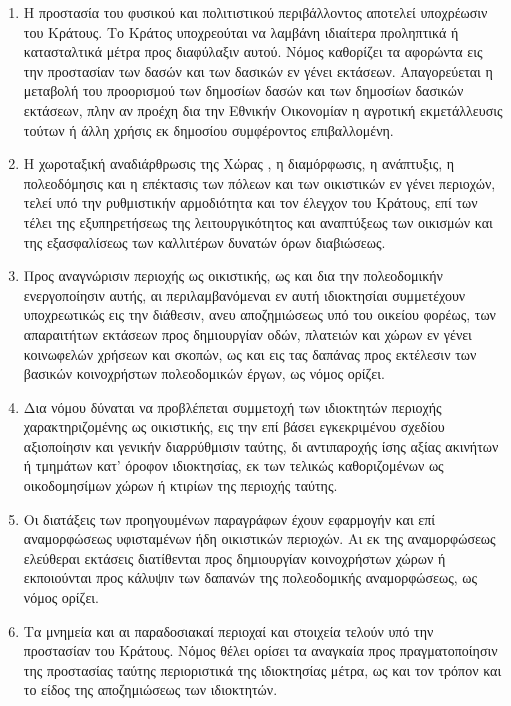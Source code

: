 \documentclass[twoside, a4paper, 10pt]{article}
\begin{document}
\begin{multicols}{2}
\begin{enumerate}
\begin{BigQuote}
\begin{enumerate}
  \item[1.] Η προστασία του φυσικού και πολιτιστικού περιβάλλοντος αποτελεί υποχρέωσιν του Κράτους. Το Κράτος  υποχρεούται να λαμβάνη ιδιαίτερα προληπτικά ή κατασταλτικά μέτρα προς διαφύλαξιν αυτού. Νόμος καθορίζει τα αφορώντα εις την προστασίαν των δασών και των δασικών εν γένει εκτάσεων. Απαγορεύεται  η μεταβολή του προορισμού των δημοσίων δασών και των δημοσίων δασικών εκτάσεων, πλην αν προέχη δια την Εθνικήν Οικονομίαν η αγροτική  εκμετάλλευσις τούτων ή άλλη χρήσις εκ δημοσίου συμφέροντος επιβαλλομένη.
  \item[2.] Η χωροταξική αναδιάρθρωσις της Χώρας , η διαμόρφωσις, η ανάπτυξις, η πολεοδόμησις και η επέκτασις των πόλεων και των οικιστικών εν γένει περιοχών, τελεί υπό την ρυθμιστικήν αρμοδιότητα και τον έλεγχον του Κράτους, επί των τέλει της εξυπηρετήσεως της  λειτουργικότητος και αναπτύξεως των οικισμών και της εξασφαλίσεως των καλλιτέρων δυνατών όρων διαβιώσεως.
  \item[3.] Προς αναγνώρισιν περιοχής ως οικιστικής, ως και δια την πολεοδομικήν ενεργοποίησιν αυτής, αι περιλαμβανόμεναι εν αυτή ιδιοκτησίαι συμμετέχουν υποχρεωτικώς εις την διάθεσιν, ανευ αποζημιώσεως υπό του οικείου φορέως, των απαραιτήτων εκτάσεων προς δημιουργίαν οδών, πλατειών και χώρων εν γένει κοινωφελών χρήσεων και σκοπών, ως και εις τας δαπάνας προς εκτέλεσιν των βασικών κοινοχρήστων πολεοδομικών έργων, ως νόμος ορίζει.
  \item[4.] Δια νόμου  δύναται να προβλέπεται συμμετοχή των ιδιοκτητών περιοχής χαρακτηριζομένης ως οικιστικής, εις την επί βάσει εγκεκριμένου σχεδίου αξιοποίησιν και γενικήν διαρρύθμισιν ταύτης, δι αντιπαροχής ίσης αξίας ακινήτων ή τμημάτων κατ' όροφον ιδιοκτησίας, εκ των τελικώς καθοριζομένων ως οικοδομησίμων χώρων ή κτιρίων της περιοχής ταύτης.
  \item[5.] Οι διατάξεις των προηγουμένων παραγράφων έχουν εφαρμογήν και επί αναμορφώσεως υφισταμένων ήδη οικιστικών περιοχών. Αι εκ της αναμορφώσεως ελεύθεραι εκτάσεις διατίθενται προς δημιουργίαν κοινοχρήστων χώρων ή εκποιούνται προς κάλυψιν των δαπανών της πολεοδομικής αναμορφώσεως, ως νόμος ορίζει.
  \item[6.] Τα μνημεία και αι παραδοσιακαί περιοχαί και στοιχεία τελούν υπό την προστασίαν του Κράτους. Νόμος θέλει ορίσει τα αναγκαία προς πραγματοποίησιν της προστασίας ταύτης περιοριστικά της ιδιοκτησίας μέτρα, ως και τον τρόπον και το είδος της αποζημιώσεως των ιδιοκτητών.
\end{enumerate}


\end{BigQuote}
\end{enumerate}
\end{multicols}
\end{document}
